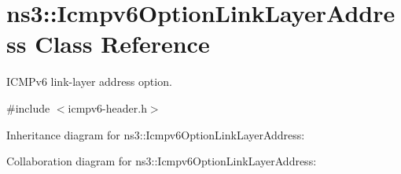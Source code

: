 \hypertarget{classns3_1_1Icmpv6OptionLinkLayerAddress}{}\section{ns3\+:\+:Icmpv6\+Option\+Link\+Layer\+Address Class Reference}
\label{classns3_1_1Icmpv6OptionLinkLayerAddress}


I\+C\+M\+Pv6 link-\/layer address option.  




{\ttfamily \#include $<$icmpv6-\/header.\+h$>$}



Inheritance diagram for ns3\+:\+:Icmpv6\+Option\+Link\+Layer\+Address\+:


Collaboration diagram for ns3\+:\+:Icmpv6\+Option\+Link\+Layer\+Address\+:
